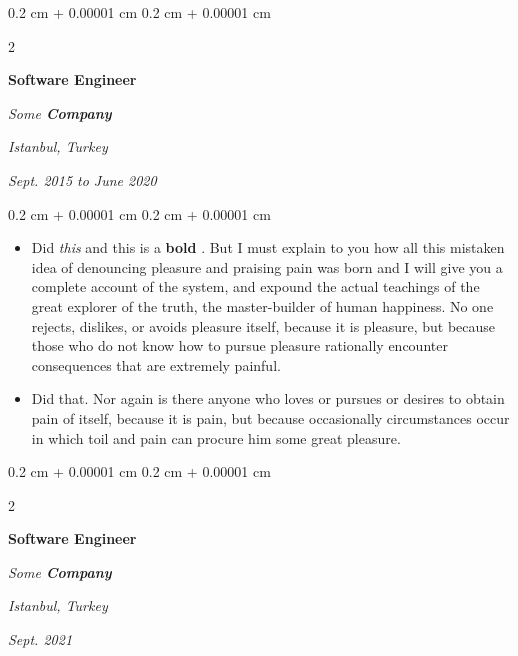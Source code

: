 \documentclass[10pt, letterpaper]{article}
\newenvironment{highlights}{
    \begin{itemize}[
        topsep=0.10 cm,
        parsep=0.10 cm,
        partopsep=0pt,
        itemsep=0pt,
        leftmargin=0.4 cm + 10pt
    ]
}{
    \end{itemize}
} %
\newenvironment{onecolentry}{
    \begin{adjustwidth}{
        0.2 cm + 0.00001 cm
    }{
        0.2 cm + 0.00001 cm
    }
}{
    \end{adjustwidth}
} %
\newenvironment{twocolentry}[2][]{
    \onecolentry
    \def\secondColumn{#2}
    \setcolumnwidth{\fill, 4.5 cm}
    \begin{paracol}{2}
}{
    \switchcolumn \raggedleft \secondColumn
    \end{paracol}
    \endonecolentry
} %
\let\hrefWithoutArrow\href
\renewcommand{\href}[2]{\hrefWithoutArrow{#1}{\mbox{\ifthenelse{\equal{#2}{}}{ }{#2 }\raisebox{.15ex}{\footnotesize \faExternalLink*}}}}
\begin{document}
        \vspace{0.2 cm-3px}

        \begin{twocolentry}{
        \textit{Istanbul, Turkey}    
            
        \textit{Sept. 2015 to June 2020}}
            \textbf{Software Engineer}
            
            \textit{Some \textbf{Company}}
        \end{twocolentry}

        \vspace{0.10 cm-3px}
        \begin{onecolentry}
            \begin{highlights}
                \item Did \textit{this} and this is a \textbf{bold} \href{https://example.com}{link}. But I must explain to you how all this mistaken idea of denouncing pleasure and praising pain was born and I will give you a complete account of the system, and expound the actual teachings of the great explorer of the truth, the master-builder of human happiness. No one rejects, dislikes, or avoids pleasure itself, because it is pleasure, but because those who do not know how to pursue pleasure rationally encounter consequences that are extremely painful.
                \item Did that. Nor again is there anyone who loves or pursues or desires to obtain pain of itself, because it is pain, but because occasionally circumstances occur in which toil and pain can procure him some great pleasure.
            \end{highlights}
        \end{onecolentry}


        \vspace{0.2 cm-3px}

        \begin{twocolentry}{
        \textit{Istanbul, Turkey}    
            
        \textit{Sept. 2021}}
            \textbf{Software Engineer}
            
            \textit{Some \textbf{Company}}
        \end{twocolentry}
\end{document}

